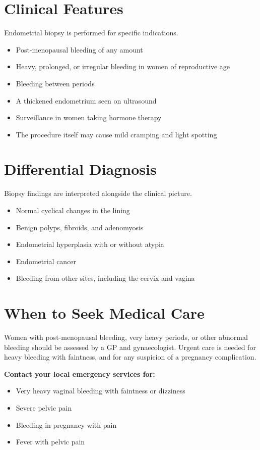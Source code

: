 \section*{Clinical Features}
Endometrial biopsy is performed for specific indications.
\begin{itemize}
    \item Post-menopausal bleeding of any amount
    \item Heavy, prolonged, or irregular bleeding in women of reproductive age
    \item Bleeding between periods
    \item A thickened endometrium seen on ultrasound
    \item Surveillance in women taking hormone therapy
    \item The procedure itself may cause mild cramping and light spotting
\end{itemize}

\section*{Differential Diagnosis}
Biopsy findings are interpreted alongside the clinical picture.
\begin{itemize}
    \item Normal cyclical changes in the lining
    \item Benign polyps, fibroids, and adenomyosis
    \item Endometrial hyperplasia with or without atypia
    \item Endometrial cancer
    \item Bleeding from other sites, including the cervix and vagina
\end{itemize}

\section*{When to Seek Medical Care}
Women with post-menopausal bleeding, very heavy periods, or other abnormal bleeding should be assessed by a GP and gynaecologist. Urgent care is needed for heavy bleeding with faintness, and for any suspicion of a pregnancy complication.

\textbf{Contact your local emergency services for:}
\begin{itemize}
    \item Very heavy vaginal bleeding with faintness or dizziness
    \item Severe pelvic pain
    \item Bleeding in pregnancy with pain
    \item Fever with pelvic pain
\end{itemize}

